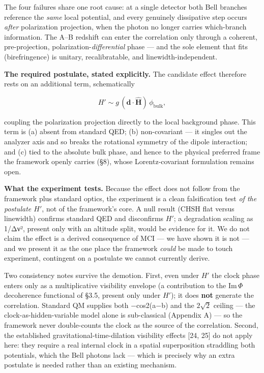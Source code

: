 \documentclass[
]{article}
\begin{document}
The four failures share one root cause: at a single detector both Bell
branches reference the \emph{same} local potential, and every genuinely
dissipative step occurs \emph{after} polarization projection, when the
photon no longer carries which-branch information. The A--B redshift can
enter the correlation only through a coherent, pre-projection,
polarization-\emph{differential} phase --- and the sole element that
fits (birefringence) is unitary, recalibratable, and
linewidth-independent.

\textbf{The required postulate, stated explicitly.} The candidate effect
therefore rests on an additional term, schematically

\[H' \sim g\,(\mathbf{d}\cdot\hat{\mathbf{H}})\,\phi_{\text{bulk}},\]

coupling the polarization projection directly to the local background
phase. This term is (a) absent from standard QED; (b) non-covariant ---
it singles out the analyzer axis and so breaks the rotational symmetry
of the dipole interaction; and (c) tied to the absolute bulk phase, and
hence to the physical preferred frame the framework openly carries (§8),
whose Lorentz-covariant formulation remains open.

\textbf{What the experiment tests.} Because the effect does not follow
from the framework plus standard optics, the experiment is a clean
falsification test \emph{of the postulate \(H'\)}, not of the
framework's core. A null result (CHSH flat versus linewidth) confirms
standard QED and disconfirms \(H'\); a degradation scaling as 1/Δν²,
present only with an altitude split, would be evidence for it. We do not
claim the effect is a derived consequence of MCI --- we have shown it is
not --- and we present it as the one place the framework \emph{could} be
made to touch experiment, contingent on a postulate we cannot currently
derive.

Two consistency notes survive the demotion. First, even under \(H'\) the
clock phase enters only as a multiplicative visibility envelope (a
contribution to the \(\mathrm{Im}\,\Phi\) decoherence functional of
§3.5, present only under \(H'\)); it does \textbf{not} generate the
correlation. Standard QM supplies both −cos2(a−b) and the \(2\sqrt{2}\)
ceiling --- the clock-as-hidden-variable model alone is sub-classical
(Appendix A) --- so the framework never double-counts the clock as the
source of the correlation. Second, the established
gravitational-time-dilation visibility effects {[}24, 25{]} do not apply
here: they require a real internal clock in a spatial superposition
straddling both potentials, which the Bell photons lack --- which is
precisely why an extra postulate is needed rather than an existing
mechanism.
\end{document}
